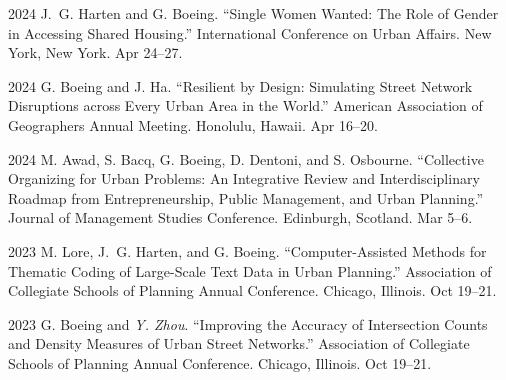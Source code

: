 \documentclass[11pt,letterpaper]{report}
\begin{document}
    \begin{tablist}




        \item[2024] \tab{}J.~G. Harten and G. Boeing. \enquote{Single Women Wanted: The Role of Gender in Accessing Shared Housing.} International Conference on Urban Affairs. New York, New York. Apr 24--27.

        \item[2024] \tab{}G. Boeing and J. Ha. \enquote{Resilient by Design: Simulating Street Network Disruptions across Every Urban Area in the World.} American Association of Geographers Annual Meeting. Honolulu, Hawaii. Apr 16--20.

        \item[2024] \tab{}M. Awad, S. Bacq, G. Boeing, D. Dentoni, and S. Osbourne. \enquote{Collective Organizing for Urban Problems: An Integrative Review and Interdisciplinary Roadmap from Entrepreneurship, Public Management, and Urban Planning.} Journal of Management Studies Conference. Edinburgh, Scotland. Mar 5--6.

        \item[2023] \tab{}M. Lore, J.~G. Harten, and G. Boeing. \enquote{Computer-Assisted Methods for Thematic Coding of Large-Scale Text Data in Urban Planning.} Association of Collegiate Schools of Planning Annual Conference. Chicago, Illinois. Oct 19--21.

        \item[2023] \tab{}G. Boeing and \textit{Y. Zhou}. \enquote{Improving the Accuracy of Intersection Counts and Density Measures of Urban Street Networks.} Association of Collegiate Schools of Planning Annual Conference. Chicago, Illinois. Oct 19--21.


\end{tablist}
\end{document}
